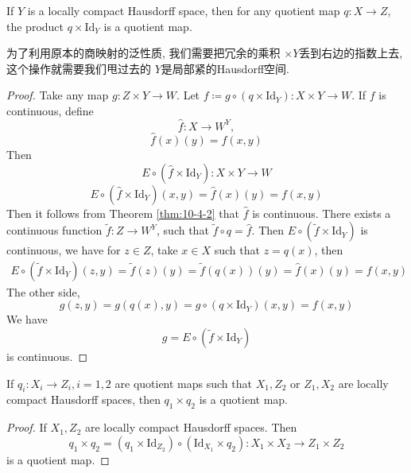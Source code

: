 \documentclass[../main.tex]{subfiles}
\begin{document}
   \begin{theorem}{}{}
If $Y$ is a locally compact Hausdorff space, then for any quotient map $q:X \to Z$, the product $q \times \mathrm{Id}_Y$ is a quotient map.
\end{theorem}
\begin{proofsketch}
    为了利用原本的商映射的泛性质, 我们需要把冗余的乘积 \(  \times Y  \)丢到右边的指数上去, 这个操作就需要我们甩过去的 \(  Y  \)是局部紧的Hausdorff空间.  
\end{proofsketch}
\begin{proof}
    Take any map \(  g:  Z\times Y\to W  \). Let \(  f\coloneqq g\circ \left( q\times \mathrm{Id}_{Y} \right)  :X\times Y\to W \).   If \(  f  \) is continuous, define \[
    \hat{f}: X\to W^{Y},
    \] \[
    \hat{f}\left( x \right)\left( y \right)= f\left( x,y \right)
    \]  Then \[
    E\circ \left( \hat{f}\times \mathrm{Id}_{Y} \right): X\times Y\to W 
    \] \[
    E\circ \left( \hat{f}\times \mathrm{Id}_{Y} \right)\left( x,y \right)= \hat{f}\left( x \right)\left( y \right)  = f\left( x,y \right)   
    \]Then it follows from Theorem \ref{thm:10-4-2} that \(  \hat{f}  \) is continuous. There exists a continuous function \(  \tilde{f}: Z\to W^{Y}  \), such that \(  \tilde{f}\circ q= \hat{f}  \).  Then \(  E\circ \left( \tilde{f} \times \mathrm{Id}_{Y} \right)   \) is continuous, we have for \(  z \in Z  \), take \(  x \in X  \) such that \(  z=  q\left( x \right)   \), then    \[
   \begin{aligned}
    E\circ \left( \tilde{f}\times \mathrm{Id}_{Y} \right)\left( z,y \right)= \tilde{f}  \left( z \right)\left( y \right)  = \tilde{f}\left( q\left( x \right)  \right)\left( y \right)= \hat{f}\left( x \right)\left( y \right)= f\left( x,y \right)    
   \end{aligned}
    \] The other side,  \[
    g\left( z,y \right)= g\left( q\left( x \right),y  \right)  = g\circ \left( q\times \mathrm{Id}_{Y} \right)\left(x,y \right)= f\left( x,y \right)   
    \] We have \[
    g = E\circ \left( \tilde{f}\times \mathrm{Id}_{Y} \right) 
    \] is continuous.
\end{proof}

\begin{corollary}{}{}
If $q_i: X_i \to Z_i, i=1,2$ are quotient maps such that $X_1, Z_2$ or $Z_1, X_2$ are locally compact Hausdorff spaces, then $q_1 \times q_2$ is a quotient map.
\end{corollary}
\begin{proof}
    If \(  X_1,Z_2  \) are locally compact Hausdorff spaces. Then \[
    q_1\times q_2= \left( q_1\times \mathrm{Id}_{Z_2} \right)\circ \left( \mathrm{Id}_{X_1}\times q_2 \right) :X_1\times X_2\to Z_1\times Z_2
    \] is a quotient map.
\end{proof}
\end{document}

